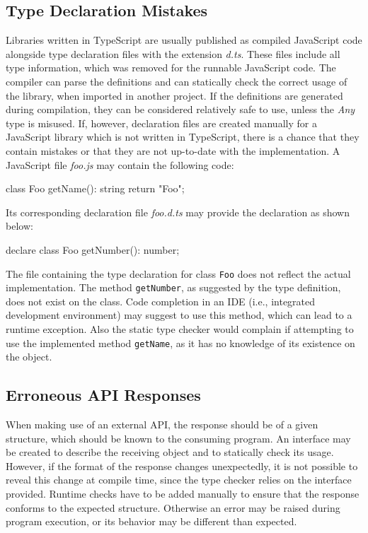 \subsection{Type Declaration Mistakes}

Libraries written in TypeScript are usually published as compiled JavaScript code alongside type declaration files with the extension \emph{d.ts}. These files include all type information, which was removed for the runnable JavaScript code. The compiler can parse the definitions and can statically check the correct usage of the library, when imported in another project. If the definitions are generated during compilation, they can be considered relatively safe to use, unless the \emph{Any} type is misused. If, however, declaration files are created manually for a JavaScript library which is not written in TypeScript, there is a chance that they contain mistakes or that they are not up-to-date with the implementation. A JavaScript file \emph{foo.js} may contain the following code:
\begin{JsCode}[numbers=none]
class Foo {
  getName(): string {
    return "Foo";
  }
}
\end{JsCode}
Its corresponding declaration file \emph{foo.d.ts} may provide the declaration as shown below:
\begin{JsCode}[numbers=none]
declare class Foo {
  getNumber(): number;
}
\end{JsCode}
The file containing the type declaration for class \texttt{Foo} does not reflect the actual implementation. The method \texttt{getNumber}, as suggested by the type definition, does not exist on the class. Code completion in an IDE (i.e., integrated development environment) may suggest to use this method, which can lead to a runtime exception. Also the static type checker would complain if attempting to use the implemented method \texttt{getName}, as it has no knowledge of its existence on the object.

\subsection{Erroneous API Responses}

When making use of an external API, the response should be of a given structure, which should be known to the consuming program. An interface may be created to describe the receiving object and to statically check its usage. However, if the format of the response changes unexpectedly, it is not possible to reveal this change at compile time, since the type checker relies on the interface provided. Runtime checks have to be added manually to ensure that the response conforms to the expected structure. Otherwise an error may be raised during program execution, or its behavior may be different than expected.

